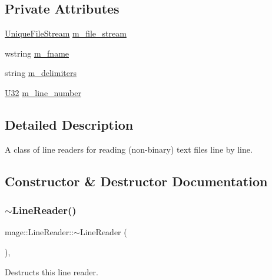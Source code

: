 \subsection*{Private Attributes}
\begin{DoxyCompactItemize}
\item 
\hyperlink{namespacemage_a0ee1bd45ad7dbb3dc8c8e1770e3538d4}{Unique\+File\+Stream} \hyperlink{classmage_1_1_line_reader_a510ff5355c6d26d7c29dc692ef18a3e2}{m\+\_\+file\+\_\+stream}
\item 
wstring \hyperlink{classmage_1_1_line_reader_ad6f55ba12fc610ab2fc1c26a48d12321}{m\+\_\+fname}
\item 
string \hyperlink{classmage_1_1_line_reader_a6de3398ac59fdd98f8c40cff6f5c1075}{m\+\_\+delimiters}
\item 
\hyperlink{namespacemage_a41c104c036fba3756a74e19f793eeaa1}{U32} \hyperlink{classmage_1_1_line_reader_ab145590a7e115106c0987905fde98393}{m\+\_\+line\+\_\+number}
\end{DoxyCompactItemize}


\subsection{Detailed Description}
A class of line readers for reading (non-\/binary) text files line by line. 

\subsection{Constructor \& Destructor Documentation}
\hypertarget{classmage_1_1_line_reader_ad9753ea392ebe5b3867852d3392fb1e7}{}\label{classmage_1_1_line_reader_ad9753ea392ebe5b3867852d3392fb1e7} 
\subsubsection{\texorpdfstring{$\sim$\+Line\+Reader()}{~LineReader()}}
{\footnotesize\ttfamily mage\+::\+Line\+Reader\+::$\sim$\+Line\+Reader (\begin{DoxyParamCaption}{ }\end{DoxyParamCaption})\hspace{0.3cm}{\ttfamily [virtual]}, {\ttfamily [default]}}

Destructs this line reader. \hypertarget{classmage_1_1_line_reader_ab4a46321d7ea3ecda2d6390c78a7285b}{}\label{classmage_1_1_line_reader_ab4a46321d7ea3ecda2d6390c78a7285b} 
